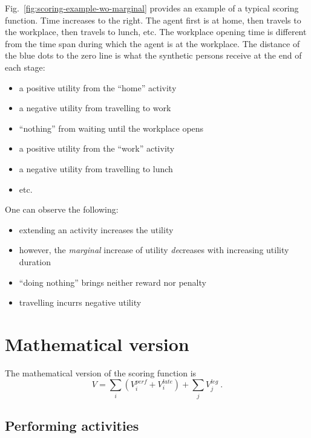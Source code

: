 Fig.~\ref{fig:scoring-example-wo-marginal} provides an example of a typical scoring function.  
%
Time increases to the right. 
%
The agent first is at home, then travels to the workplace, then travels to lunch, etc.
%
The workplace opening time is different from the time span during which the agent is at the workplace.
%
The distance of the blue dots to the zero line is what the synthetic persons receive at the end of each stage:
\begin{itemize}
\item a positive utility from the ``home'' activity
\item a negative utility from travelling to work
\item ``nothing'' from waiting until the workplace opens
\item a positive utility from the ``work'' activity
\item a negative utility from travelling to lunch
\item etc.
\end{itemize}

One can observe the following:
\begin{itemize}
\item extending an activity increases the utility
\item however, the \emph{marginal} increase of utility \emph{de}creases with increasing utility duration
\item ``doing nothing'' brings neither reward nor penalty
\item travelling incurrs negative utility
\end{itemize}



\section{Mathematical version}

The mathematical version of the scoring function is
\[
V = \sum_i ( V^{perf}_i + V^{late}_i) + \sum_j V^{leg}_j \ .
\]

\subsection{Performing activities}

